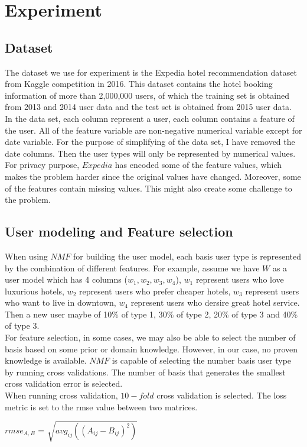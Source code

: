 \documentclass[11pt]{article} %
\begin{document}
\section{Experiment}
\subsection{Dataset}
The dataset we use for experiment is the Expedia hotel recommendation dataset from Kaggle competition in 2016. This dataset contains the hotel booking information of more than 2,000,000 users, of which the training set is obtained from 2013 and 2014 user data and the test set is obtained from 2015 user data.\\
In the data set, each column represent a user, each column contains a feature of the user. All of the feature variable are non-negative numerical variable except for date variable. For the purpose of simplifying of the data set, I have removed the date columns. Then the user types will only be represented by numerical values.\\
For privacy purpose, $Expedia$ has encoded some of the feature values, which makes the problem harder since the original values have changed. Moreover, some of the features contain missing values. This might also create some challenge to the problem.

\subsection{User modeling and Feature selection}
When using $NMF$ for building the user model, each basis user type is represented by the combination of different features. For example, assume we have $W$ as a user model which has 4 columns ($w_{1}, w_{2}, w_{3}, w_{4}$), $w_{1}$ represent users who love luxurious hotels, $w_{2}$ represent users who prefer cheaper hotels, $w_{3}$ represent users who want to live in downtown, $w_{4}$ represent users who dersire great hotel service. Then a new user maybe of 10\% of type 1, 30\% of type 2, 20\% of type 3 and 40\% of type 3.\\    
For feature selection, in some cases, we may also be able to select the number of basis based on some prior or domain knowledge. However, in our case, no proven knowledge is available. $NMF$ is capable of selecting the number basis user type by running cross validations. The number of basis that generates the smallest cross validation error is selected.\\
When running cross validation, $10-fold$ cross validation is selected. The loss metric is set to the rmse value between two matrices.\\
\centerline{$rmse_{A,B}$ = $\sqrt{avg_{ij}((A_{ij}-B_{ij})^{2})}$}
\end{document}
